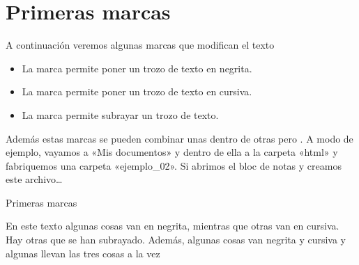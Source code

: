 \documentclass[a4paper,12pt,spanish]{sphinxmanual}
\begin{document}
\chapter{Primeras marcas}
\label{\detokenize{index:primeras-marcas}}
A continuación veremos algunas marcas que modifican el texto
\begin{itemize}
\item {} 
La marca  permite poner un trozo de texto en negrita.

\item {} 
La marca  permite poner un trozo de texto en cursiva.

\item {} 
La marca  permite subrayar un trozo de texto.

\end{itemize}

Además estas marcas se pueden combinar unas dentro de otras pero . A modo de ejemplo, vayamos a «Mis documentos» y dentro de ella a la carpeta «html» y fabriquemos una carpeta «ejemplo\_02». Si abrimos el bloc de notas y creamos este archivo…

%
\begin{sphinxVerbatim}[commandchars=\\\{\}]
    Primeras marcas

En este texto algunas cosas van en negrita,
mientras que otras van en cursiva. Hay otras que
se han subrayado. Además, algunas cosas
van negrita y cursiva y algunas
llevan las tres cosas a la vez
\end{sphinxVerbatim}
\end{document}
